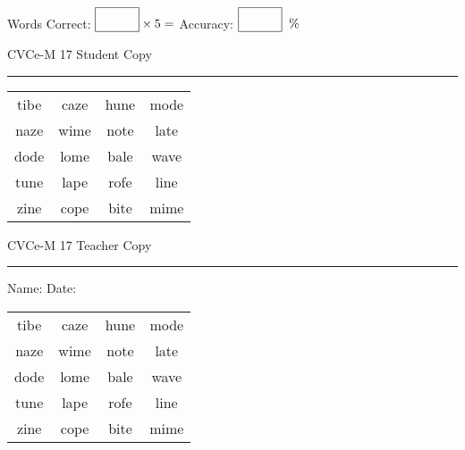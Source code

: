 \documentclass{memoir}
\begin{document}
\small

Words Correct: $\fbox{\phantom{\huge 100}} \times 5 = $ Accuracy: $\fbox{\phantom{\huge 100}}\;\; \%$ 

\vfill

\newpage


\footnotesize \noindent
CVCe-M 17 \hfill Student Copy
\smallskip
\hrule

\Large

\setlength{\tabcolsep}{14pt}
\def\arraystretch{2}

{\selectfont


\begin{vplace}[0.5]
\begin{center}
\begin{tabular}{cccc}
tibe & caze & hune & mode \\
naze & wime & note & late \\
dode & lome & bale & wave \\
tune & lape & rofe & line \\
zine & cope & bite & mime \\
\end{tabular}
\end{center}
\end{vplace}

}

\newpage

\footnotesize \noindent
CVCe-M 17 \hfill Teacher Copy
\smallskip
\hrule

\small

\vfill

\noindent
Name: \underline{\hspace{1.75in}} \hfill Date: \underline{\hspace{1in}}

\Large

{\selectfont


\begin{vplace}[0.5]
\begin{center}
\begin{tabular}{cccc}
tibe & caze & hune & mode \\
naze & wime & note & late \\
dode & lome & bale & wave \\
tune & lape & rofe & line \\
zine & cope & bite & mime \\
\end{tabular}
\end{center}
\end{vplace}



}
\end{document}
